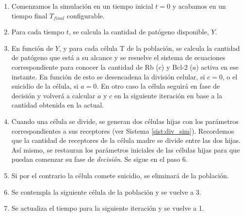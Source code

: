 \begin{enumerate}
	\item Comenzamos la simulación en un tiempo inicial $t=0$ y acabamos en un tiempo final $T_{final}$ configurable.
	
	\item Para cada tiempo $t$, se calcula la cantidad de patógeno disponible, $Y$. 
	
	\item En función de $Y$, y para cada célula T de la población, se calcula la cantidad de patógeno que está a su alcance y se resuelve el sistema de ecuaciones correspondiente para conocer la cantidad de Rb ($c$) y Bcl-2 ($a$) activa en ese instante. En función de esto se desencadena la división celular, si $c = 0$, o el suicidio de la célula, si $a = 0$. En otro caso la célula seguirá en fase de decisión y volverá a calcular $a$ y $c$ en la siguiente iteración en base a la cantidad obtenida en la actual.
	
	\item Cuando una célula se divide, se generan dos células hijas con los parámetros correspondientes a sus receptores (ver Sistema \ref{sist:div_sim}). Recordemos que la cantidad de receptores de la célula madre se divide entre las dos hijas. Así mismo, se restauran los parámetros iniciales de las células hijas para que puedan comenzar su fase de \textit{decisión}. Se sigue en el paso 6.
	
	\item Si por el contrario la célula comete suicidio, se eliminará de la población. 

	\item Se contempla la siguiente célula de la población y se vuelve a 3.
	
	\item Se actualiza el tiempo para la siguiente iteración y se vuelve a 1.
\end{enumerate}


